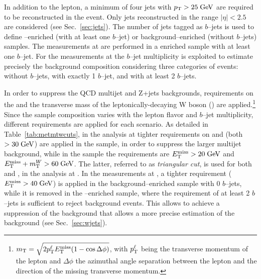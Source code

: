 In addition to the lepton, a minimum of four jets with $p_{\mathrm{T}}{}>25 \; \mathrm{GeV}$
are required to be reconstructed in the event. Only jets reconstructed
in the range $|\eta|<2.5$ are considered (see
Sec.~\ref{sec:jets}). The number of jets tagged as $b$--jets is used
to define \ttbar{}--enriched (with at least one $b$--jet) or
background--enriched (without $b$--jets) samples. The measurements at
\seventev{} are performed in a \ttbar{} enriched sample with at least
one $b$--jet. For the measurements at \eighttev{} the \mbox{$b$--jet}
multiplicity is exploited to estimate precisely the background
composition considering three categories of events: without $b$--jets,
with exactly 1 $b$--jet, and with at least 2 $b$--jets. 

In order to suppress the QCD multijet and Z+jets backgrounds,
requirements on the \met{} and the transverse mass of the
leptonically-decaying W boson (\mtw{}) are applied.\footnote{$m_{\mathrm{T}} = \sqrt{2
    p^\ell_{\rm T} \mbox{\ensuremath{E_{\mathrm{T}}^{\mathrm{miss}}}} (1-\cos\Delta\phi)}$, with $p^\ell_{\rm T}$
  being the transverse momentum of the lepton and
  $\Delta\phi$ the azimuthal angle separation between the lepton and
  the direction of the missing transverse momentum.} Since the sample
composition varies with the lepton flavor and $b$--jet multiplicity,
different requirements are applied for each scenario. As detailed in
Table~\ref{tab:metmtwcuts}, in the analysis at \seventev{} tighter
requirements on \met{} and \mtw{} (both $>30 \; \mathrm{GeV}$) are applied in the
\ejets{} sample, in order to suppress the larger multijet background,
while in the \mujets{} sample the requirements are $\mbox{\ensuremath{E_{\mathrm{T}}^{\mathrm{miss}}}}{}>20\; \mathrm{GeV}{}$
and $\mbox{\ensuremath{E_{\mathrm{T}}^{\mathrm{miss}}}}{}+m_{\mathrm T}^W{}>60 \; \mathrm{GeV}{}$. The latter, referred to as {\it
  triangular cut}, is used for both \ejets{} and \mujets, in the
analysis at \eighttev{}. 
In the measurements at \eighttev{}, a tighter requirement
($\mbox{\ensuremath{E_{\mathrm{T}}^{\mathrm{miss}}}}{}>40\; \mathrm{GeV}{}$) is applied in the background--enriched sample with
0 $b$--jets, while it is removed in the \ttbar{}--enriched sample,
where the requirement of at least 2 $b$--jets is sufficient to reject
background events. This allows to achieve a suppression of the
\zjets{} background that allows a more precise estimation of the
\wjets{} background (see Sec.~\ref{sec:wjets}). 

